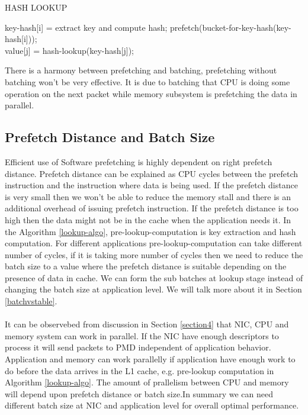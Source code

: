 \begin{algorithm}[H]
 \caption{HASH LOOKUP}
 \label{lookup-algo}
 \begin{algorithmic}[1]
     \State key-hash[i] = extract key and compute hash; \label{hash-compute-line}
     \State prefetch(bucket-for-key-hash(key-hash[i])); \label{prefetch-line}
 \EndFor
 \\
     \State value[j] = hash-lookup(key-hash[j]); \label{hash-lookup-line}
 \EndFor
 \end{algorithmic}
\end{algorithm}
There is a harmony between prefetching and batching, prefetching without batching won't be very effective. It is due to batching that CPU is doing some operation on the next packet while memory subsystem is prefetching the data in parallel.

\subsection{Prefetch Distance and Batch Size}
\label{subbatching}
Efficient use of Software prefetching is highly dependent on right prefetch distance. Prefetch distance can be explained as CPU cycles between the prefetch instruction and the instruction where data is being used. If the prefetch distance is very small then we won't be able to reduce the memory stall and there is an additional overhead of issuing prefetch instruction. If the prefetch distance is too high then the data might not be in the cache when the application needs it. In the Algorithm \ref{lookup-algo}, pre-lookup-computation is key extraction and hash computation. For different applications pre-lookup-computation can take different number of cycles, if it is taking more number of cycles then we need to reduce the batch size to a value where the prefetch distance is suitable depending on the presence of data in cache. We can form the sub batches at lookup stage instead of changing the batch size at application level. We will talk more about it in Section \ref{batchvstable}.
\\
\\
It can be observebed from discussion in Section \ref{section4} that NIC, CPU and memory system can work in parallel. If the NIC have enough descriptors to process it will send packets to PMD independent of application behavior. Application and memory can work parallelly if application have enough work to do before the data arrives in the L1 cache, e.g. pre-lookup computation in Algorithm \ref{lookup-algo}. The amount of prallelism between CPU and memory will depend upon prefetch distance or batch size.In summary we can need different batch size at NIC and application level for overall optimal performance. 

